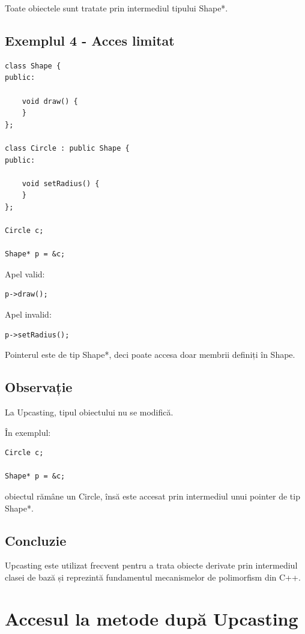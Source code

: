 \documentclass[12pt,a4paper]{article}
\begin{document}
Toate obiectele sunt tratate prin intermediul tipului Shape*.

\subsection{Exemplul 4 - Acces limitat}

\begin{verbatim}
class Shape {
public:

    void draw() {
    }
};

class Circle : public Shape {
public:

    void setRadius() {
    }
};

Circle c;

Shape* p = &c;
\end{verbatim}

Apel valid:

\begin{verbatim}
p->draw();
\end{verbatim}

Apel invalid:

\begin{verbatim}
p->setRadius();
\end{verbatim}

Pointerul este de tip Shape*, deci poate accesa doar membrii definiți în Shape.

\subsection{Observație}

La Upcasting, tipul obiectului nu se modifică.

În exemplul:

\begin{verbatim}
Circle c;

Shape* p = &c;
\end{verbatim}

obiectul rămâne un Circle, însă este accesat prin intermediul unui pointer de tip Shape*.

\subsection{Concluzie}

Upcasting este utilizat frecvent pentru a trata obiecte derivate prin intermediul clasei de bază și reprezintă fundamentul mecanismelor de polimorfism din C++.

\section{Accesul la metode după Upcasting}
\end{document}
